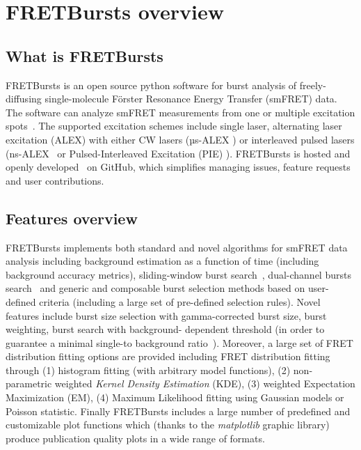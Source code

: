 \section{FRETBursts overview}

\subsection{What is FRETBursts}

FRETBursts is an open source python software for burst analysis of freely-diffusing
single-molecule Förster Resonance Energy Transfer (smFRET) data.
The software can analyze smFRET measurements
from one or multiple excitation spots~\cite{Ingargiola_2013}. The supported
excitation schemes include single laser, alternating laser excitation (ALEX)
with either CW lasers (µs-ALEX \cite{Kapanidis_2005})
or interleaved pulsed lasers (ns-ALEX~\cite{Laurence_2005} or
Pulsed-Interleaved Excitation (PIE) \cite{M_ller_2005}).
FRETBursts is hosted and openly developed~\cite{Prli__2012} on GitHub, which
simplifies managing issues, feature requests and user contributions.

\subsection{Features overview}

FRETBursts implements both standard and novel algorithms for smFRET data analysis
including background estimation as a function of time (including background accuracy
metrics), sliding-window burst search~\cite{Eggeling_1998}, dual-channel bursts search~\cite{Nir_2006} and
generic and composable burst selection methods based on user-defined criteria
(including a large set of pre-defined selection rules). Novel features include burst size
selection with gamma-corrected burst size, burst weighting, burst search with background-
dependent threshold (in order to guarantee a minimal single-to background ratio~\cite{Michalet_2012}).
Moreover, a large set of FRET distribution fitting options are provided including
FRET distribution fitting through (1) histogram fitting (with arbitrary model functions),
(2)  non-parametric weighted \textit{Kernel Density Estimation} (KDE), (3) weighted
Expectation Maximization (EM), (4) Maximum Likelihood fitting using Gaussian models
or Poisson statistic. Finally FRETBursts includes a large number of
predefined and customizable plot functions which (thanks to the \textit{matplotlib}
graphic library) produce publication quality plots in a wide range of formats.

